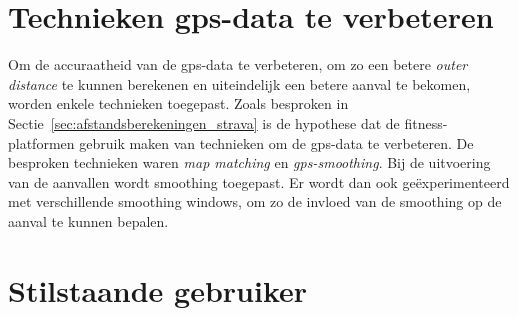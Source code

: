 \section{Technieken gps-data te verbeteren}
Om de accuraatheid van de \ac{gps}-data te verbeteren, om zo een betere
\textit{outer distance} te kunnen berekenen en uiteindelijk een betere aanval
te bekomen, worden enkele technieken toegepast. Zoals besproken in
Sectie~\ref{sec:afstandsberekeningen_strava} is de hypothese dat de
fitness-platformen gebruik maken van technieken om de \ac{gps}-data te
verbeteren. De besproken technieken waren \textit{map matching} en
\textit{\ac{gps}-smoothing}. Bij de uitvoering van de aanvallen wordt smoothing
toegepast. Er wordt dan ook geëxperimenteerd met verschillende smoothing
windows, om zo de invloed van de smoothing op de aanval te kunnen bepalen.

\section{Stilstaande gebruiker}